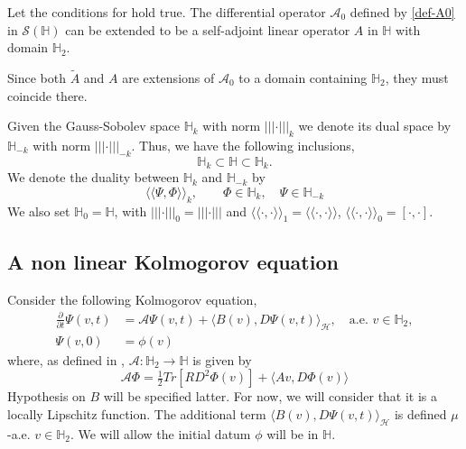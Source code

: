 \documentclass[review, onefignum, onetabnum]{siamart171218}
\begin{document}
\begin{theorem}\label{the-Pt-A1}
    Let the conditions for  hold true. The differential
    operator $\mathcal{A}_0 $  defined by \eqref{def-A0} in 
    $\mathcal{S}(\mathbb{H})$ can be extended to be a self-adjoint
    linear operator $A$ in $\mathbb{H}$ with domain $\mathbb{H}_{2}$.
    
\end{theorem}
%
    Since both $\tilde{A}$ and $A$ are extensions of $\mathcal{A}_0 $ to a 
    domain containing $\mathbb{H}_{2}$, they must coincide there. 

    Given the Gauss-Sobolev space $\mathbb{H}_{k}$ with norm  
$|||\cdot|||_{k} $ we denote its dual space by $\mathbb{H}_{-k}$ with norm  
$|||\cdot|||_{-k}$. Thus, we have the following inclusions,
\[
    \mathbb{H}_{k} \subset \mathbb{H} \subset \mathbb{H}_{k}.
\]
We denote the duality between $ \mathbb{H}_{k}$ and $ \mathbb{H}_{-k}$ by
\[
    \langle
        \langle
            \Psi,\Phi 
        \rangle
    \rangle_k,
    \qquad 
    \Phi\in\mathbb{H}_{k},
    \quad \Psi\in\mathbb{H}_{-k}
\]
We also set $\mathbb{H}_{0}= \mathbb{H}$, 
with $|||\cdot|||_{0}= |||\cdot|||$ and 
$
    \langle
        \langle
            \cdot,\cdot 
        \rangle
    \rangle_1= 
    \langle
        \langle
            \cdot,\cdot 
        \rangle
    \rangle 
$, 
$
    \langle
        \langle
            \cdot,\cdot 
        \rangle
    \rangle_0 = [\cdot,\cdot]
$.
\subsection{A non linear Kolmogorov equation}
Consider the following \sloppy Kolmogorov equation,
%
\begin{equation}
    \label{P1s3.1}
    \begin{aligned}
        \frac{\partial}{\partial t}
            \Psi(v,t)
            &= 
               \mathcal{A}\Psi(v,t)
                + 
                \langle 
                    B(v),D\Psi(v,t) 
                \rangle_\mathcal{H}, 
                \quad \text{a.e. } 
                v\in\mathbb{H}_2, 
        \\
        \Psi(v,0)
            &=
                \phi(v)\nonumber
    \end{aligned}
\end{equation}
%
where, as defined in , 
$\mathcal{A}:\mathbb{H}_2 \to \mathbb{H}$ is given by
%
\begin{equation}\label{def-A}
    \mathcal{A} \Phi = 
        \tfrac{1}{2} Tr[RD^2 \Phi(v)] 
        +
        \langle 
            A v, D\Phi(v)
        \rangle 
 \end{equation}
Hypothesis on $B$ will be specified latter. For now, we will consider that it 
is a locally Lipschitz function. The additional term 
$ \langle B(v),D\Psi(v,t) \rangle_\mathcal{H}$ is defined $\mu$-a.e. 
$v\in\mathbb{H}_2$. We will allow the initial datum $\phi$ will be
in $\mathbb{H}$. 
\end{document}
